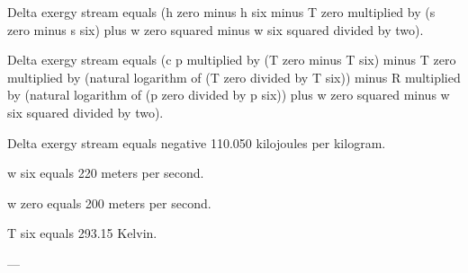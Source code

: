 Delta exergy stream equals (h zero minus h six minus T zero multiplied by (s zero minus s six) plus w zero squared minus w six squared divided by two).  

Delta exergy stream equals (c p multiplied by (T zero minus T six) minus T zero multiplied by (natural logarithm of (T zero divided by T six)) minus R multiplied by (natural logarithm of (p zero divided by p six)) plus w zero squared minus w six squared divided by two).  

Delta exergy stream equals negative 110.050 kilojoules per kilogram.  

w six equals 220 meters per second.  

w zero equals 200 meters per second.  

T six equals 293.15 Kelvin.  

---